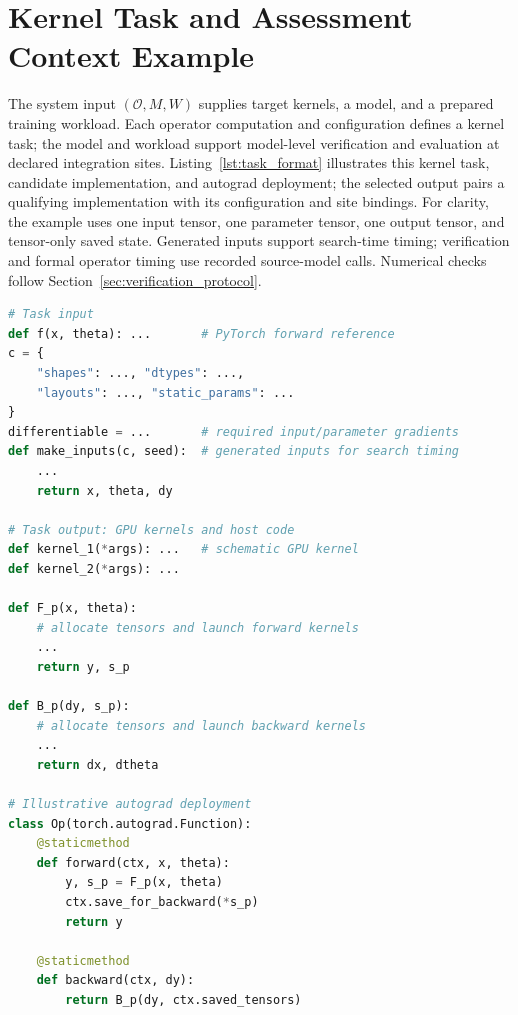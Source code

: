 \section{Kernel Task and Assessment Context Example}
\label{app:task_format}

The system input $(\mathcal O,M,W)$ supplies target kernels, a model, and a prepared training workload. Each operator computation and configuration defines a kernel task; the model and workload support model-level verification and evaluation at declared integration sites. Listing~\ref{lst:task_format} illustrates this kernel task, candidate implementation, and autograd deployment; the selected output pairs a qualifying implementation with its configuration and site bindings. For clarity, the example uses one input tensor, one parameter tensor, one output tensor, and tensor-only saved state. Generated inputs support search-time timing; verification and formal operator timing use recorded source-model calls. Numerical checks follow Section~\ref{sec:verification_protocol}.

\begin{lstlisting}[language=Python, basicstyle=\ttfamily\footnotesize, captionpos=b, label=lst:task_format, caption={Kernel-task input, candidate implementation, and autograd deployment interface used for verification and evaluation.}]
# Task input
def f(x, theta): ...       # PyTorch forward reference
c = {
    "shapes": ..., "dtypes": ...,
    "layouts": ..., "static_params": ...
}
differentiable = ...       # required input/parameter gradients
def make_inputs(c, seed):  # generated inputs for search timing
    ...
    return x, theta, dy

# Task output: GPU kernels and host code
def kernel_1(*args): ...   # schematic GPU kernel
def kernel_2(*args): ...

def F_p(x, theta):
    # allocate tensors and launch forward kernels
    ...
    return y, s_p

def B_p(dy, s_p):
    # allocate tensors and launch backward kernels
    ...
    return dx, dtheta

# Illustrative autograd deployment
class Op(torch.autograd.Function):
    @staticmethod
    def forward(ctx, x, theta):
        y, s_p = F_p(x, theta)
        ctx.save_for_backward(*s_p)
        return y

    @staticmethod
    def backward(ctx, dy):
        return B_p(dy, ctx.saved_tensors)
\end{lstlisting}





